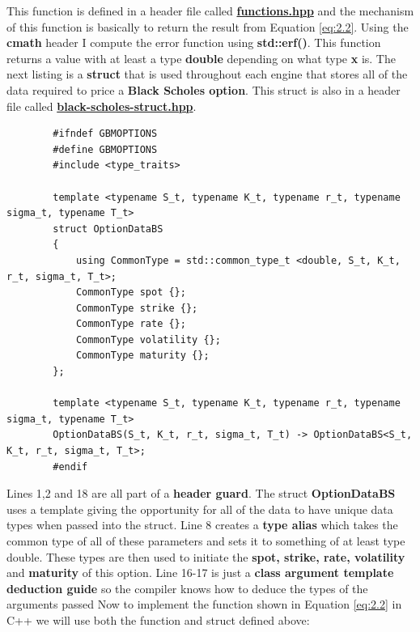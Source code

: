 \documentclass[12pt]{article}
\numberwithin{equation}{section}
\begin{document}
This function is defined in a header file called \href{https://github.com/neeldevsen/pricingengines/blob/main/I%3A%20European%20Options/Headers/functions.hpp}{\textbf{functions.hpp}} and the mechanism of this function is basically to return the result from Equation \ref{eq:2.2}. Using the \textbf{cmath} header I compute the error function using \textbf{std::erf()}. This function returns a value with at least a type \textbf{double} depending on what type \textbf{x} is.
 \newpage
 The next listing  is a \textbf{struct} that is used throughout each engine that stores all of the data required to price a \textbf{Black Scholes option}. This struct is also in a header file called \href{https://github.com/neeldevsen/pricingengines/blob/main/I%3A%20European%20Options/Headers/black_scholes_struct.hpp}{\textbf{black-scholes-struct.hpp}}. 
 \begin{listing}[ht]
 	\begin{verbatim}
 		#ifndef GBMOPTIONS
 		#define GBMOPTIONS
 		#include <type_traits>
 		
 		template <typename S_t, typename K_t, typename r_t, typename sigma_t, typename T_t>
 		struct OptionDataBS
 		{
 			using CommonType = std::common_type_t <double, S_t, K_t, r_t, sigma_t, T_t>;
 			CommonType spot {};
 			CommonType strike {};
 			CommonType rate {};
 			CommonType volatility {};
 			CommonType maturity {};
 		};
 		
 		template <typename S_t, typename K_t, typename r_t, typename sigma_t, typename T_t>
 		OptionDataBS(S_t, K_t, r_t, sigma_t, T_t) -> OptionDataBS<S_t, K_t, r_t, sigma_t, T_t>;
 		#endif
 	\end{verbatim}
 	\caption{Black Scholes Option Data Struct}
 	\label{lst:bsstruct}
 \end{listing}
 \newline
 Lines 1,2 and 18 are all part of a\textbf{ header guard}. The struct \textbf{OptionDataBS} uses a template giving the opportunity for all of the data to have unique data types when passed into the struct. Line 8 creates a \textbf{type alias} which takes the common type of all of these parameters and sets it to something of at least type double.  These types are then used to initiate the \textbf{spot, strike, rate, volatility} and \textbf{maturity} of this option.  Line 16-17 is just a \textbf{class argument template deduction guide} so the compiler knows how to deduce the types of the arguments passed
\newline
\newline
Now to implement the function shown in Equation \ref{eq:2.2} in C++ we will use both the function and struct defined above: 
\end{document}
